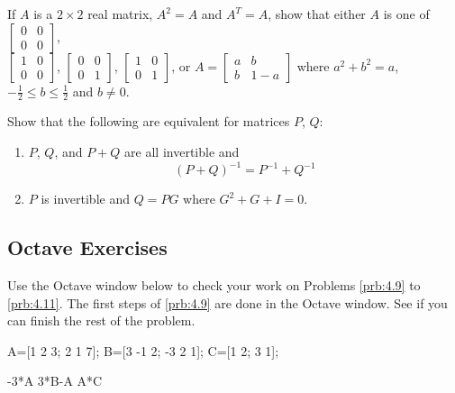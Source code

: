 \documentclass{ximera}
\begin{document}
\begin{problem}
If $A$ is a $2 \times 2$ real matrix, $A^{2} = A$ and $A^{T} = A$, show that either $A$ is one of $\left[ \begin{array}{rr}
0 & 0 \\
0 & 0
\end{array} \right]$, \\ $\left[ \begin{array}{rr}
1 & 0 \\
0 & 0
\end{array} \right]$, $\left[ \begin{array}{rr}
0 & 0 \\
0 & 1
\end{array} \right]$, $\left[ \begin{array}{rr}
1 & 0 \\
0 & 1
\end{array} \right]$, or $A = \left[ \begin{array}{cc}
a & b \\
b & 1 - a
\end{array} \right]$
 where $a^{2} + b^{2} = a$, $-\frac{1}{2} \leq b \leq \frac{1}{2}$ and $b \neq 0$.

\end{problem}

\begin{problem}
Show that the following are equivalent for matrices $P$, $Q$:


\begin{enumerate}
\item $P$, $Q$, and $P + Q$ are all invertible and
\begin{equation*}
(P + Q)^{-1} = P^{-1} + Q^{-1}
\end{equation*}

\item $P$ is invertible and $Q = PG$ where $G^{2} + G + I = 0$.

\end{enumerate}
\end{problem}



\subsection*{Octave Exercises}
\begin{problem}\label{oct:matr_mult}
Use the Octave window below to check your work on Problems \ref{prb:4.9} to \ref{prb:4.11}.  The first steps of \ref{prb:4.9} are done in the Octave window.  See if you can finish the rest of the problem.

A=[1 2 3; 2 1 7];
B=[3 -1 2; -3 2 1];
C=[1 2; 3 1];

-3*A
3*B-A
A*C %
\end{problem}
\end{document}
